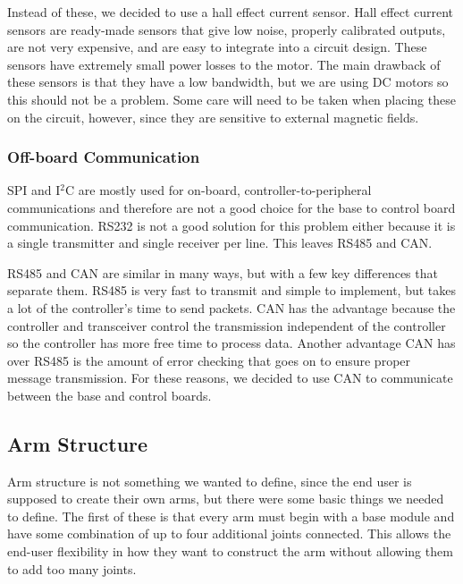 \noindent Instead of these, we decided to use a hall effect current sensor. Hall effect current sensors are ready-made sensors that give low noise, properly calibrated outputs, are not very expensive, and are easy to integrate into a circuit design. These sensors have extremely small power losses to the motor. The main drawback of these sensors is that they have a low bandwidth, but we are using DC motors so this should not be a problem. Some care will need to be taken when placing these on the circuit, however, since they are sensitive to external magnetic fields.

\subsubsection{Off-board Communication}
SPI and I$^2$C are mostly used for on-board, controller-to-peripheral communications and therefore are not a good choice for the base to control board communication. RS232 is not a good solution for this problem either because it is a single transmitter and single receiver per line. This leaves RS485 and CAN.

\noindent RS485 and CAN are similar in many ways, but with a few key differences that separate them. RS485 is very fast to transmit and simple to implement, but takes a lot of the controller's time to send packets. CAN has the advantage because the controller and transceiver control the transmission independent of the controller so the controller has more free time to process data. Another advantage CAN has over RS485 is the amount of error checking that goes on to ensure proper message transmission. For these reasons, we decided to use CAN to communicate between the base and control boards.

\subsection{Arm Structure}
Arm structure is not something we wanted to define, since the end user is supposed to create their own arms, but there were some basic things we needed to define. The first of these is that every arm must begin with a base module and have some combination of up to four additional joints connected.  This allows the end-user flexibility in how they want to construct the arm without allowing them to add too many joints.

